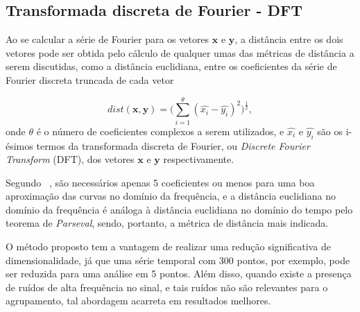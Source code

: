 


\subsection{Transformada discreta de Fourier - DFT}

Ao se calcular a série de Fourier para os vetores $\bm{x}$ e $\bm{y}$, a distância entre os dois vetores pode ser obtida pelo cálculo de qualquer umas das métricas de distância a serem discutidas, como a distância euclidiana, entre os coeficientes da série de Fourier discreta truncada de cada vetor 

\begin{equation}
dist(\bm{x},\bm{y}) = \bigg(\sum_{i=1}^{\theta} (\hat{x_i} -\hat{y_i})^2 \bigg)^{\frac{1}{2}},
\end{equation}
onde $\theta$ é o número de coeficientes complexos a serem utilizados, e $\hat{x_i}$ e $\hat{y_i}$ são os i-ésimos termos da transformada discreta de Fourier, ou \emph{Discrete Fourier Transform} (DFT), dos vetores $\bm{x}$ e $\bm{y}$ respectivamente.

Segundo ~\parencite{FFT}, são necessários apenas 5 coeficientes ou menos para uma boa aproximação das curvas no domínio da frequência, e a distância euclidiana no domínio da frequência é análoga à distância euclidiana no domínio do tempo pelo teorema de \emph{Parseval}, sendo, portanto, a métrica de distância mais indicada.

O método proposto tem a vantagem de realizar uma redução significativa de dimensionalidade, já que uma série temporal com 300 pontos, por exemplo, pode ser reduzida para uma análise em 5 pontos. Além disso, quando existe a presença de ruídos de alta frequência no sinal, e tais ruídos não são relevantes para o agrupamento, tal abordagem acarreta em resultados melhores.




